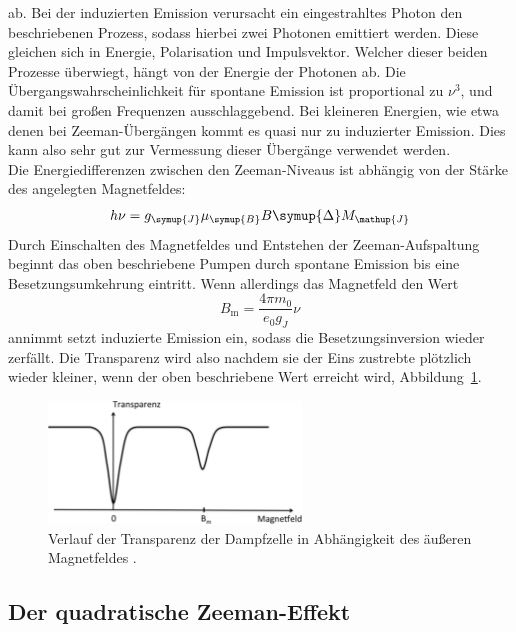 \documentclass[
  bibliography=totoc,     %
  captions=tableheading,  %
  titlepage=firstiscover, %
]{scrartcl}
\begin{document}
ab. Bei der induzierten Emission verursacht ein eingestrahltes Photon
den beschriebenen Prozess, sodass hierbei zwei Photonen emittiert werden. Diese
gleichen sich in Energie, Polarisation und Impulsvektor. Welcher dieser beiden
Prozesse überwiegt, hängt von der Energie der Photonen ab. Die
Übergangswahrscheinlichkeit für spontane Emission ist proportional zu $\nu^3$,
und damit bei großen Frequenzen ausschlaggebend. Bei kleineren Energien, wie
etwa denen bei Zeeman-Übergängen kommt es quasi nur zu induzierter Emission.
Dies kann also sehr gut zur Vermessung dieser Übergänge verwendet werden. \\
Die Energiedifferenzen zwischen den Zeeman-Niveaus ist abhängig von der Stärke
des angelegten Magnetfeldes:
%
\begin{equation}
  h\nu=g_{\symup{J}}\mu_{\symup{B}}B\symup{\Delta}M_\mathup{J}
  \label{eq:übergangsenergie}
\end{equation}
%
Durch Einschalten des Magnetfeldes und Entstehen der Zeeman-Aufspaltung beginnt
das oben beschriebene Pumpen durch spontane Emission bis eine
Besetzungsumkehrung eintritt. Wenn allerdings das Magnetfeld den Wert
%
\begin{equation}
  B_\mathup{m}=\frac{4\pi m_0}{e_0g_J}\nu
\end{equation}
%
annimmt setzt induzierte Emission ein, sodass die Besetzungsinversion wieder
zerfällt. Die Transparenz wird also nachdem sie der Eins zustrebte plötzlich
wieder kleiner, wenn der oben beschriebene Wert erreicht wird, Abbildung~\ref{fig:transparenz_b}.
%
\begin{figure}[htb]
  \centering
  \includegraphics[width=0.6\textwidth]{transparenzkurve.pdf}
  \caption{Verlauf der Transparenz der Dampfzelle in Abhängigkeit des äußeren Magnetfeldes \cite{anleitung}.}
  \label{fig:transparenz_b}
\end{figure}
%


\subsection{Der quadratische Zeeman-Effekt}
\end{document}
